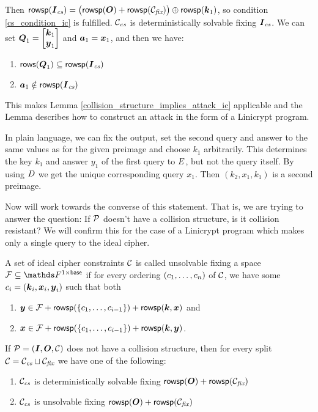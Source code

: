 Then $\rowsp(\Ics) = \big( \rowsp(\O) + \rowsp(\Cfix) \big) \oplus \rowsp(\vk_1)$, so condition \eqref{cs_condition_ic} is fulfilled.
$\Ccs$ is deterministically solvable fixing $\Ics$.
We can set $\Q_1 = \m{\vk_1 \\ \vy_1}$ and $\va_1 = \vx_1$, and then we have: 
\begin{enumerate}
    \item $\rows(\Q_1) \subseteq \rowsp(\Ics)$
    \item $\va_1 \notin \rowsp(\Ics)$
\end{enumerate}

This makes Lemma \ref{collision_structure_implies_attack_ic} applicable and the Lemma describes how to construct an attack in the form of a Linicrypt program.

In plain language,
we can fix the output, set the second query and answer to the same values as for the given preimage and choose $k_1$ arbitrarily.
This determines the key $k_1$ and answer $y_1$ of the first query to $\E$, but not the query itself.
By using $\D$ we get the unique corresponding query $x_1$.
Then $(k_2, x_1, k_1)$ is a second preimage.

Now will work towards the converse of this statement.
That is, we are trying to answer the question:
If $\P$ doesn't have a collision structure,
is it collision resistant?
We will confirm this for the case of a Linicrypt program which makes only a single query to the ideal cipher.

\begin{defn}
    A set of ideal cipher constraints $\C$ is called unsolvable fixing a space $\Fix \subseteq \Frowsp$ if for every ordering $(\dts c n)$ of $\C$,
    we have some $c_i = (\vk_i, \vx_i, \vy_i)$ such that both
    \begin{enumerate}
    \item    $\vy \in \Fix + \rowsp(\{\dts c {i-1}\}) + \rowsp(\vk, \vx)$ and
    \item    $\vx \in \Fix + \rowsp(\{\dts c {i-1}\}) + \rowsp(\vk, \vy)$.
    \end{enumerate}
\end{defn}

\begin{lemma}
\label{lemma_no_collision_structure}
    If $\P = (\I,\O,\C)$ does not have a collision structure,
    then for every split $\C = \Ccs \sqcup \Cfix$ we have one of the following:
    \begin{enumerate}
    \item $\Ccs$ is deterministically solvable fixing $\rowsp(\O) + \rowsp(\Cfix)$
    \item $\Ccs$ is unsolvable fixing $\rowsp(\O) + \rowsp(\Cfix)$
    \end{enumerate}
\end{lemma}

